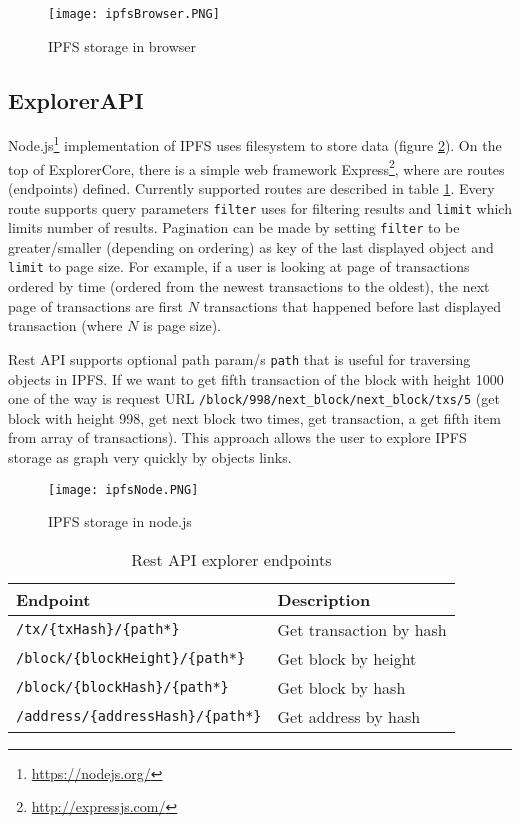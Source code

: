 \begin{figure}[h]
    \centering
    \texttt{[image: ipfsBrowser.PNG]}
    \caption{IPFS storage in browser}
    \label{browserIPFS}
\end{figure}


\subsection{ExplorerAPI}
Node.js\footnote{\url{https://nodejs.org/}} implementation of IPFS uses filesystem to store data (figure \ref{nodeIPFS}). On the top of ExplorerCore, there is a simple web framework Express\footnote{\url{http://expressjs.com/}}, where are routes (endpoints) defined. Currently supported routes are described in table \ref{tab:explorerApiEndpoints}. Every route supports query parameters \texttt{filter} uses for filtering results and \texttt{limit} which limits number of results. Pagination can be made by setting \texttt{filter} to be greater/smaller (depending on ordering) as key of the last displayed object and \texttt{limit} to page size. For example, if a user is looking at page of transactions ordered by time (ordered from the newest transactions to the oldest), the next page of transactions are first \(N\) transactions that happened before last displayed transaction (where \(N\) is page size).

Rest API supports optional path param/s \texttt{path} that is useful for traversing objects in IPFS. If we want to get fifth transaction of the block with height 1000 one of the way is request URL \texttt{/block/998/next\_block/next\_block/txs/5} (get block with height 998, get next block two times, get transaction, a get fifth item from array of transactions). This approach allows the user to explore IPFS storage as graph very quickly by objects links.

\begin{figure}[h]
    \centering
    \texttt{[image: ipfsNode.PNG]}
    \caption{IPFS storage in node.js}
    \label{nodeIPFS}
\end{figure}


\begin{table}[h]
    \centering
    \begin{tabular}{|l|l|}
    \hline
    Endpoint                           & Description                       \\ \hline
    \texttt{/tx/\{txHash\}/\{path*\}}           & Get transaction by hash  \\ \hline
    \texttt{/block/\{blockHeight\}/\{path*\}}   & Get block by height      \\ \hline
    \texttt{/block/\{blockHash\}/\{path*\}}     & Get block by hash        \\ \hline
    \texttt{/address/\{addressHash\}/\{path*\}} & Get address by hash      \\ \hline
    \end{tabular}
    \caption{Rest API explorer endpoints}
    \label{tab:explorerApiEndpoints}
\end{table}